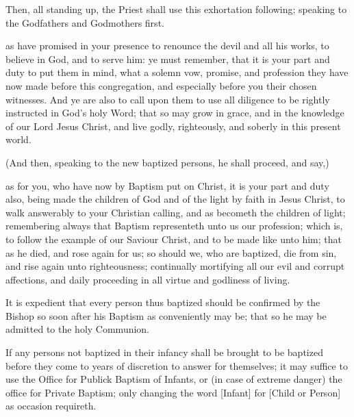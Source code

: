 \begin{rubric}
Then, all standing up, the Priest shall use this exhortation following; speaking to the Godfathers and Godmothers first.
\end{rubric}

 as  have promised in your presence to renounce the devil and all his works, to believe in God, and to serve him: ye must remember, that it is your part and duty to put them in mind, what a solemn vow, promise, and profession they have now made before this congregation, and especially before you their chosen witnesses.
And ye are also to call upon them to use all diligence to be rightly instructed in God's holy Word; that so  may grow in grace, and in the knowledge of our Lord Jesus Christ, and live godly, righteously, and soberly in this present world.

\begin{rubric}
(And then, speaking to the new baptized persons, he shall proceed, and say,)
\end{rubric}

 as for you, who have now by Baptism put on Christ, it is your part and duty also, being made the children of God and of the light by faith in Jesus Christ, to walk answerably to your Christian calling, and as becometh the children of light; remembering always that Baptism representeth unto us our profession; which is, to follow the example of our Saviour Christ, and to be made like unto him; that as he died, and rose again for us; so should we, who are baptized, die from sin, and rise again unto righteousness; continually mortifying all our evil and corrupt affections, and daily proceeding in all virtue and godliness of living.

\begin{rubric}
It is expedient that every person thus baptized should be confirmed by the Bishop so soon after his Baptism as conveniently may be; that so he may be admitted to the holy Communion.
\end{rubric}

\begin{rubric}
If any persons not baptized in their infancy shall be brought to be baptized before they come to years of discretion to answer for themselves; it may suffice to use the Office for Publick Baptism of Infants, or (in case of extreme danger) the office for Private Baptism; only changing the word [Infant] for [Child or Person] as occasion requireth.
\end{rubric}

